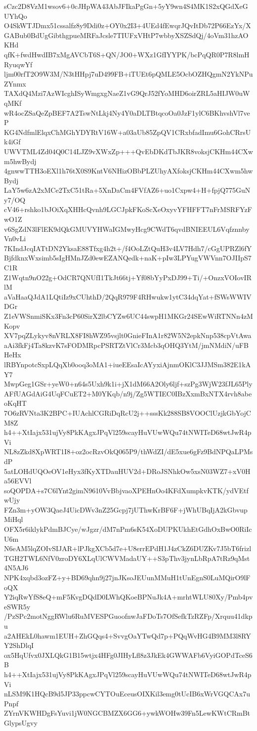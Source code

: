 sCzc2D8VzM1wsov6+0cJHpWA43AbJFIkaPgGn+5yY9wn4S4MK1S2xQGdXeGUYhQo
O4SkWTJDmx51cssalfz8y9Ddi0z+OY0x2I3+4UEd4fEwqrJQvItDb72P66EzYx/X
GABub0BdUgGibthgpueMRFaJcsle7TIUFxVHtP7wbbyXSZSdQj/4oVm31hzAOKHd
qfK+fwdHwdIB7xMgAVCbT6S+QN/JO0+WXz1GfIYYPK/bcPqQR0P7R8lmHRyuqwYf
ljm00rfT2O9W3M/N3tHHpj7uD499FB+iTUEt6pQMLE5OcbOZHQgmN2YkNPuZYnmx
TAXdQ4Mzi7AzWIcghISyWmgxgNaeZ1vG9QrJ52fYoMHD6oirZRL5aHIJW0uWqMKf
wR4ocZSaQeZpBEF7A2TswNtLkj4Ny4Y0aDLTBtqcoOa0JzF1ylC6BKhvshVl7veP
KG4NdfmlElqxChMGhYDYRtV16W+a03aUb85ZpQV1CRxbfadImu6GohCRrsUk4iGf
UWVTML4Zd04Q0C14LJZ9vXWxZp+++QvEbDKdTbJKR8voksjCKHm44CXwm5hwBydj
4gnwwTTH3oEXl1h76tX0S9KntV6NHizOBbPLZUhyAXfoksjCKHm44CXwm5hwBydj
LaY5w6zA2xMCe2TxC51tRa+5XnDaCm4FVfAZ6+uo1Cxpw4+H+fpjQ775GuNy7/OQ
cV46+rshko1bJOiXqXHHcQvnh9LGCJpkFKoScXeOxyvYFHFFT7nFrMSRFYzFwO1Z
v6SgZdN3lFlEK9dQkGMUVYHWaIGMwyHcg9CWdT6qvdBNIEEUL6VqfznnbyVn0vLi
7KIndJcqIATtDN2YksaE88Tfxg4h2t+/f4OoLZtQuH3v4LV7Hdh7/cGgUPRZl6fY
BjfdknxWxsimb5sIgHMnJZd0ewEZANQedk+naK+pIw3LPYugVWVnn7OJIIpS7C1R
Z1Wqtn9nO22g+OdCR7QNUfI1TkJt66tj+Yf08bYyPxDJ99+Ti/+OnzxVOIovIRlM
aVaHaaQJdA1LQtiIz9xCUhthD/2QqR979F4RHwukw1ytC34dqYat+fSWsWWIVDGr
Z1eVWSnmiSKx3Fn3cP60SirX2lbCYZw6UC44swpH1MKGr24SEwWiRTNNn4zMKopv
XV7pqZLykyv8nVRLX8FI8hWZ95vsjlt0GnieFInA1r82W5N2epkNnp538cpVtAwa
aAi3fkFj4Ta8kzvK7sFODMRpcPSRTZtVlCr3Mcb3qOHQ3YtM/jmNMdiN/uFBHeHx
lRBYnpotcSxpLQqXb0ooq3oMA1+iueEEsaIcAYyxiAjnmOKlC3JJMSm382E1kAY7
MwpGeg1GSr+yeW0+n64s5Uxh9k1i+jX1dM66A2Oly6ljf+szPg3WjW23fJL65Ply
AFfUAGdAiG4UqFCuET2+M0YKqb/n9j/Zg5WTIEC0IBzXxmBxNTX4rvh8abeoKqHT
7O6zRVNta3K2BPC+IUAchlCGRiDqRcU2j++sssKk288SB8VOOClUzjkGbYojCM8Z
h4++XtIajx531ujVy8PkKAgxJPqVl259scayHuVUwWQu74tNWITeD68wtJwR4pVi
NL8zZkd8XpWRT1I8+oz2ocRzvOkQ065P9/thWdZI/dE5xue6gFz9BdNPQaLPMsdP
5atLOHdUQOeOV1eHyx3fKyXTDauHUV2d+DRoJSNhkOw5xsN03WZ7+xV0Ha56EVVl
soQOPDA+s7C6lYnt2gimN9610VvBbjvaoXPEHnOo4KFdXumpkvKTK/ydVEtfwUjy
FZn3m+yOW3QaeJ4UicDWv3nZ25Gcpj7jUThwKrBF6F+jWhUBqIjA2kGbvupMiHql
OFX5r6iklykPdmBJCye/wJgzr/dM7nPm6sK54XoDUPKUkhEtGdhOxBwO0RiIcU6m
N6eAM5lqZOIvSIJAR+lPJkgXCb5d7e+U8errEPdH1J4zCkZ6DUZKv7J5bT6frizl
TGH2TWL6NfV0zroDY6XLqUlCWVMadaUY++S3pThv3jynLbRpA7tRz9qMst4N5AJ6
NPK4xqbd3ozFZ+y+BD69qhn9j27jnJKsoJEUunMMuH1tUnEgnS0LuMQirO9lFoQX
Y2iqRwYfS8eQ+mF5KvgDQdD0LWhQKoeBPNuJk4A+mrhtWLU80Xy/Pmb4pveSWR5y
/PzSPc2motNggRWlu6RuMVESPGuoofnwJaFDoTs7OfSefkTzRZFp/Xrquu41dkpu
a2AHEkL0hawm1EUH+ZhGQqs4+SvvgOaYTwQd7p+PQqWvHG4B9MM3l8RYY2ShDlqI
ox5HqUfvx0JXLQkG1B15wtjx4HFg0JIHyLfl8z3JkEk4GWWAFb6VyiGOPdTceS6B
h4++XtIajx531ujVy8PkKAgxJPqVl259scayHuVUwWQu74tNWITeD68wtJwR4pVi
nLSM9K1HQcB9d5JP33ppcwCYTOuEceusOIXKil3emg0tUcIB6xWrVGQCAx7uPnpf
ZYrnVKWHDgFsYuvi1jW0NGCBMZX6GG6+ywkWOHw39Fn5LewKWtCRmBtGlypsUgvy
